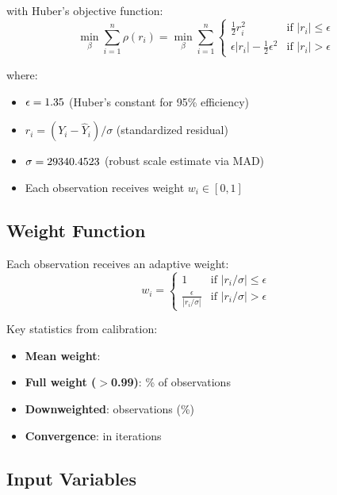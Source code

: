 with Huber's objective function:
\begin{equation}
\min_\beta \sum_{i=1}^{n} \rho(r_i) = \min_\beta \sum_{i=1}^{n} \begin{cases}
\frac{1}{2}r_i^2 & \text{if } |r_i| \leq \epsilon \\
\epsilon|r_i| - \frac{1}{2}\epsilon^2 & \text{if } |r_i| > \epsilon
\end{cases}
\end{equation}

where:
\begin{itemize}
    \item $\epsilon = 1.35{}$ (Huber's constant for 95\% efficiency)
    \item $r_i = (Y_i - \hat{Y}_i)/\sigma$ (standardized residual)
    \item $\sigma = 29340.4523{}$ (robust scale estimate via MAD)
    \item Each observation receives weight $w_i \in [0, 1]$
\end{itemize}

\subsection{Weight Function}

Each observation receives an adaptive weight:
\begin{equation}
w_i = \begin{cases}
1 & \text{if } |r_i/\sigma| \leq \epsilon \\
\frac{\epsilon}{|r_i/\sigma|} & \text{if } |r_i/\sigma| > \epsilon
\end{cases}
\end{equation}

Key statistics from calibration:
\begin{itemize}
    \item \textbf{Mean weight}: \ModelThreeMeanWeight{}
    \item \textbf{Full weight ($>$0.99)}: \ModelThreeFullWeightPct{}\% of observations
    \item \textbf{Downweighted}: \ModelThreeOutliersDetected{} observations (\ModelThreeOutlierPercentage{}\%)
    \item \textbf{Convergence}: \ModelThreeConverged{} in \ModelThreeNumIterations{} iterations
\end{itemize}

\subsection{Input Variables}

